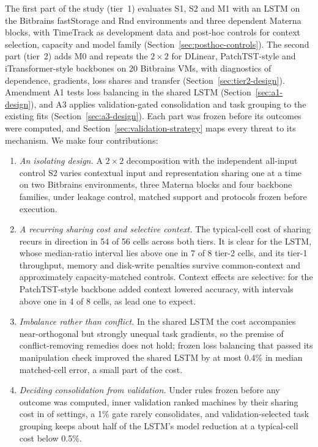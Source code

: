 \documentclass[5p,twocolumn]{elsarticle}
\begin{document}
The first part of the study (tier~1) evaluates S1, S2 and M1 with an LSTM on
the Bitbrains fastStorage and Rnd environments and three dependent Materna
blocks, with TimeTrack as development data and post-hoc controls for context
selection, capacity and model family (Section~\ref{sec:posthoc-controls}). The
second part (tier~2) adds M0 and repeats the $2\times2$ for DLinear,
PatchTST-style and iTransformer-style backbones on 20 Bitbrains VMs, with
diagnostics of dependence, gradients, loss shares and transfer
(Section~\ref{sec:tier2-design}). Amendment A1 tests loss balancing in the
shared LSTM (Section~\ref{sec:a1-design}), and A3 applies validation-gated
consolidation and task grouping to the existing fits
(Section~\ref{sec:a3-design}). Each part was frozen before its outcomes were
computed, and Section~\ref{sec:validation-strategy} maps every threat to its
mechanism. We make four contributions:

\begin{enumerate}
  \item \emph{An isolating design.} A $2\times2$ decomposition with the
    independent all-input control S2 varies contextual input and
    representation sharing one at a time on two Bitbrains environments,
    three Materna blocks and four backbone families, under leakage control,
    matched support and protocols frozen before execution.
  \item \emph{A recurring sharing cost and selective context.} The
    typical-cell cost of sharing recurs in direction in 54 of 56 cells across
    both tiers. It is clear for the LSTM, whose median-ratio interval lies
    above one in 7 of 8 tier-2 cells, and its tier-1 throughput, memory and
    disk-write penalties survive common-context and approximately
    capacity-matched controls. Context effects are selective: for the
    PatchTST-style backbone added context lowered accuracy, with intervals
    above one in 4 of 8 cells, as \citet{Han2024ChannelIndependent} lead one
    to expect.
  \item \emph{Imbalance rather than conflict.} In the shared LSTM the cost
    accompanies near-orthogonal but strongly unequal task gradients, so the
    premise of conflict-removing remedies does not hold; frozen loss balancing
    that passed its manipulation check improved the shared LSTM by at most
    0.4\% in median matched-cell error, a small part of the cost.
  \item \emph{Deciding consolidation from validation.} Under rules frozen
    before any outcome was computed, inner validation ranked machines by their
    sharing cost in \AiiiDetects{} of \AiiiFrames{} settings, a 1\% gate
    rarely consolidates, and validation-selected task grouping keeps about
    half of the LSTM's model reduction at a typical-cell cost below 0.5\%.
\end{enumerate}
\end{document}
